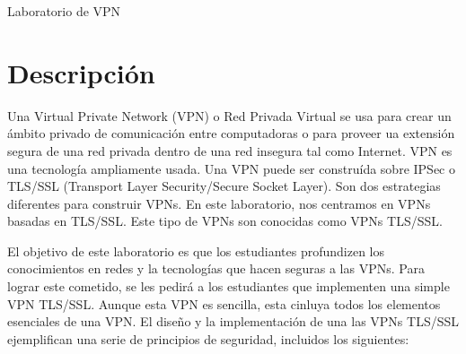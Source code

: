 
\newcommand{\commonfolder}{../../common-files}





\usepackage{longtable}
\usepackage{enumitem}
\usepackage{stackengine}
\newcommand\xrowht[2][0]{\addstackgap[.5\dimexpr#2\relax]{\vphantom{#1}}}



\newcommand{\miniVPN}{{\tt MiniVPN}\xspace}
\newcommand{\hostu}{{\tt U}\xspace}
\newcommand{\hostv}{{\tt V}\xspace}


\newcommand{\vpnFigs}{./Figs}





\begin{center}
{\LARGE Laboratorio de VPN}
\end{center}




\section{Descripción}

Una Virtual Private Network (VPN) o Red Privada Virtual se usa para crear un ámbito privado de comunicación entre computadoras o para proveer ua extensión segura de una red privada dentro de una red insegura tal como Internet. VPN es una tecnología ampliamente usada. Una VPN puede ser construída sobre IPSec o TLS/SSL (Transport Layer Security/Secure Socket Layer). 
Son dos estrategias diferentes para construir VPNs. En este laboratorio, nos centramos en VPNs basadas en  TLS/SSL. Este tipo de VPNs son conocidas como VPNs TLS/SSL.

El objetivo de este laboratorio es que los estudiantes profundizen los conocimientos en redes y la tecnologías que hacen seguras a las VPNs. Para lograr este cometido, se les pedirá a los estudiantes que implementen una simple VPN TLS/SSL.
Aunque esta VPN es sencilla, esta cinluya todos los elementos esenciales de una VPN. El diseño y la implementación de una las VPNs TLS/SSL ejemplifican
una serie de principios de seguridad, incluidos los siguientes:

